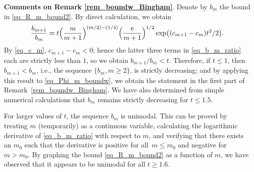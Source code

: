 \documentclass[pdftex]{sigma}
\numberwithin{equation}{section}
\begin{document}
{\textbf{Comments on Remark \ref{rem_boundw_Bingham}}}.
Denote by $b_m$ the bound in \eqref{eq_R_m_bound2}. By direct calculation, we obtain
\begin{equation}
\label{eq_b_m_ratio}
\frac{b_{m+1}}{b_m} = t \Big(\frac{m}{m+1}\Big)^{(m/2)-(1/4)} \Big(\frac{\rm e}{m+1}\Big)^{1/2} \exp\bigl((c_{m+1}-c_m) t^2/2\bigr).
\end{equation}
By \eqref{eq_c_m}, $c_{m+1} - c_m < 0$; hence the latter three terms in \eqref{eq_b_m_ratio} each are strictly less than $1$, so we obtain $b_{m+1}/b_m < t$. Therefore, if $t \le 1$, then $b_{m+1} < b_m$, i.e., the sequence $\{b_m, m \ge 2\}$, is strictly decreasing; and by applying this result to \eqref{eq_Phi_m_boundw}, we obtain the statement in the first part of Remark~\ref{rem_boundw_Bingham}. We have also determined from simple numerical calculations that $b_m$ remains strictly decreasing for $t \le 1.5$.

For larger values of $t$, the sequence $b_m$ is unimodal. This can be proved by treating $m$ (temporarily) as a continuous variable, calculating the logarithmic derivative of \eqref{eq_b_m_ratio} with respect to $m$, and verifying that there exists an $m_0$ such that the derivative is positive for all~${m \le m_0}$ and negative for $m > m_0$. By graphing the bound \eqref{eq_R_m_bound2} as a function of $m$, we have observed that it appears to be unimodal for all $t \ge 1.6$.
\end{document}
